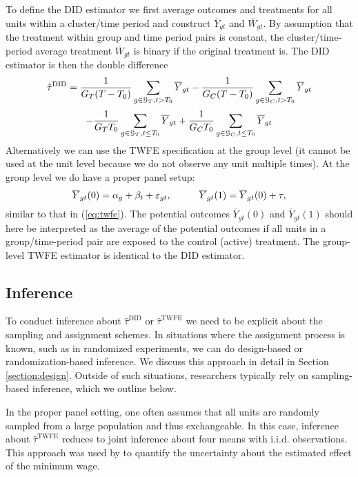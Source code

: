 \documentclass[letterpaper,12pt,leqno]{article}
\newcommand{\twfe}{\mathrm{TWFE}}
\newcommand{\htautwfe}{\hat\tau^{\twfe}}
\newcommand{\oy}{\overline{Y}}
\newcommand{\did}{\mathrm{DID}}
\begin{document}
To define the DID estimator 
we first average outcomes and treatments for all units within a cluster/time period and construct $\overline{Y}_{gt}$ and $\overline{W}_{gt}$.  By assumption that the treatment within group and time period pairs is constant, the cluster/time-period average treatment $\overline{W}_{gt}$ is binary if the original treatment is.
The DID estimator is then the double difference
\[ \hat\tau^\did=\frac{1}{G_T (T-T_0)}
\sum_{g\in {\cal G}_T,t>T_0} \oy_{gt}
-\frac{1}{G_C (T-T_0)}
\sum_{g\in {\cal G}_C,t>T_0} \oy_{gt}\]
\[
-\frac{1}{G_TT_0}
\sum_{g\in {\cal G}_T,t\leq T_0} \oy_{gt}
+\frac{1}{G_C T_0}
\sum_{g\in {\cal G}_C,t\leq T_0} \oy_{gt}
\]
Alternatively we can use the TWFE specification at the group level (it cannot be used at the unit level because we do not observe any unit multiple times). At the group level we do have a proper panel setup:
\begin{equation}\label{gwfe2} \overline{Y}_{gt}(0)=\alpha_g+\beta_t+\varepsilon_{gt},\hskip1cm \overline{Y}_{gt}(1)=\overline{Y}_{gt}(0)+\tau,\end{equation}
similar to that in (\ref{eq:twfe}). The potential outcomes $\overline{Y}_{gt}(0)$ and $\overline{Y}_{gt}(1)$ should here be interpreted as the average of the potential outcomes if all units in a group/time-period pair are exposed to the control (active) treatment. The group-level TWFE estimator is identical to the DID estimator.


\subsection{Inference}\label{section:did_inference}

To conduct inference about $\hat \tau^\did$ or $\htautwfe$ we need to be explicit about the sampling and assignment schemes. In situations where the assignment process is known, such as in randomized experiments, we can do design-based or randomization-based inference. We discuss this approach in detail in Section \ref{section:design}. Outside of such situations, researchers typically rely on sampling-based inference, which we outline below.

In the proper panel setting, one often assumes that all units are randomly sampled from a large population and thus exchangeable. In this case, inference about $\htautwfe$ reduces to joint inference about four means with i.i.d. observations. This approach was used by \citep{card1994minimum} to quantify the uncertainty about the estimated effect of the minimum wage.
\end{document}
